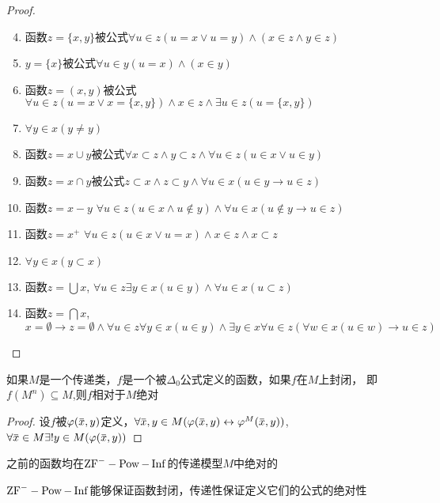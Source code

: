 \documentclass[11pt]{article}
\begin{document}
\begin{proof}
\begin{enumerate}
\setcounter{enumi}{3}
\item 函数\(z=\{x,y\}\)被公式\(\forall u\in z(u=x\vee u=y)\wedge(x\in z\wedge y\in z)\)
\item \(y=\{x\}\)被公式\(\forall u\in y(u=x)\wedge (x\in y)\)
\item 函数\(z=(x,y)\)被公式\(\forall u\in z(u=x\vee x=\{x,y\})\wedge x\in z\wedge \exists  u\in z(u=\{x,y\})\)
\item \(\forall y\in x(y\neq y)\)
\item 函数\(z=x\cup y\)被公式\(\forall x\subset z\wedge y\subset z\wedge\forall u\in z(u\in x\vee u\in y)\)
\item 函数\(z=x\cap y\)被公式\(z\subset x\wedge z\subset y\wedge\forall u\in x(u\in y\to u\in z)\)
\item 函数\(z=x-y\) \(\forall u\in z(u\in x\wedge u\notin y)\wedge \forall u\in x(u\notin y\to u\in z)\)
\item 函数\(z=x^+\) \(\forall u\in z(u\in x\vee u=x)\wedge x\in z\wedge x\subset z\)
\item \(\forall y\in x(y\subset x)\)
\item 函数\(z=\bigcup x\), \(\forall u\in z\exists y\in x(u\in y)\wedge\forall u\in x(u\subset z)\)
\item 函数\(z=\bigcap x\), \(x=\emptyset\to z=\emptyset\wedge\forall u\in z\forall y\in x(u\in y)\wedge\exists y\in x\forall u\in z(\forall w\in x(u\in w)\to u\in z)\)
\end{enumerate}
\end{proof}

\begin{lemma}[]
如果\(M\)是一个传递类，\(f\)是一个被\(\Delta_0\)公式定义的函数，如果\(f\)在\(M\)上封闭，
即\(f(M^n)\subseteq M\),则\(f\)相对于\(M\)绝对
\end{lemma}

\begin{proof}
设\(f\)被\(\varphi(\barx,y)\)定义，\(\forall\barx,y\in M(\varphi(\barx,y)\leftrightarrow\varphi^M(\barx,y))\),\(\forall\barx\in M\exists!y\in M(\varphi(\barx,y))\)
\end{proof}

\begin{corollary}[]
之前的函数均在\(\text{ZF}^--\operatorname{Pow}-\operatorname{Inf}\)的传递模型\(M\)中绝对的

\(\text{ZF}^--\operatorname{Pow}-\operatorname{Inf}\)能够保证函数封闭，传递性保证定义它们的公式的绝对性
\end{corollary}
\end{document}
